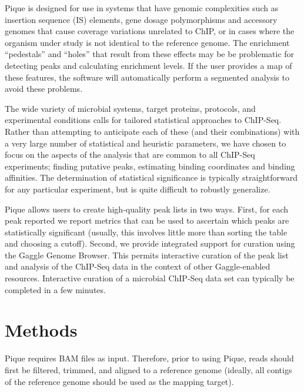 \begin{refsection}
Pique is designed for use in systems that have genomic complexities
such as insertion sequence (IS) elements, gene dosage polymorphisms
and accessory genomes that cause coverage variations unrelated to
ChIP, or in cases where the organism under study is not identical to
the reference genome. The enrichment ``pedestals'' and ``holes'' that
result from these effects may be be problematic for detecting peaks
and calculating enrichment levels. If the user provides a map of these
features, the software will automatically perform a segmented
analysis to avoid these problems.

The wide variety of microbial systems, target proteins, protocols, and
experimental conditions calls for tailored statistical approaches to
ChIP-Seq. Rather than attempting to anticipate each of these (and
their combinations) with a very large number of statistical and
heuristic parameters, we have chosen to focus on the aspects of the
analysis that are common to all ChIP-Seq experiments; finding putative
peaks, estimating binding coordinates and binding affinities. The
determination of statistical significance is typically straightforward
for any particular experiment, but is quite difficult to robustly
generalize.

Pique allows users to create high-quality peak lists in two ways.
First, for each peak reported we report metrics that can be used to
ascertain which peaks are statistically significant (usually, this
involves little more than sorting the table and choosing a
cutoff). Second, we provide integrated support for curation using the
Gaggle Genome Browser. \cite{gaggle_browser} This permits interactive
curation of the peak list and analysis of the ChIP-Seq data in the
context of other Gaggle-enabled resources. \cite{firegoose, gaggle}
Interactive curation of a microbial ChIP-Seq data set can typically be
completed in a few minutes.

\section{Methods}

\noindent Pique requires BAM files as input\cite{sam_format}.
Therefore, prior to using Pique, reads should first be filtered,
trimmed, and aligned to a reference genome (ideally, all contigs of
the reference genome should be used as the mapping target).


\end{refsection}
